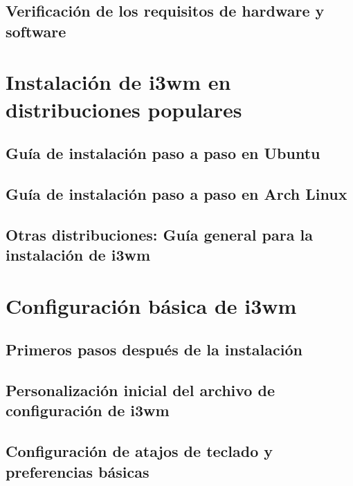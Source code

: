 \documentclass[
  jou,
  floatsintext,
  longtable,
  a4paper,
  nolmodern,
  notxfonts,
  notimes,
  12pt,
  colorlinks=true,linkcolor=blue,citecolor=blue,urlcolor=blue]{apa7}
\begin{document}
\subsection{Verificación de los requisitos de hardware y
software}\label{verificaciuxf3n-de-los-requisitos-de-hardware-y-software}

\section{Instalación de i3wm en distribuciones
populares}\label{instalaciuxf3n-de-i3wm-en-distribuciones-populares}

\subsection{Guía de instalación paso a paso en
Ubuntu}\label{guuxeda-de-instalaciuxf3n-paso-a-paso-en-ubuntu}

\subsection{Guía de instalación paso a paso en Arch
Linux}\label{guuxeda-de-instalaciuxf3n-paso-a-paso-en-arch-linux}

\subsection{Otras distribuciones: Guía general para la instalación de
i3wm}\label{otras-distribuciones-guuxeda-general-para-la-instalaciuxf3n-de-i3wm}

\section{Configuración básica de
i3wm}\label{configuraciuxf3n-buxe1sica-de-i3wm}

\subsection{Primeros pasos después de la
instalación}\label{primeros-pasos-despuuxe9s-de-la-instalaciuxf3n}

\subsection{Personalización inicial del archivo de configuración de
i3wm}\label{personalizaciuxf3n-inicial-del-archivo-de-configuraciuxf3n-de-i3wm}

\subsection{Configuración de atajos de teclado y preferencias
básicas}\label{configuraciuxf3n-de-atajos-de-teclado-y-preferencias-buxe1sicas}
\end{document}
